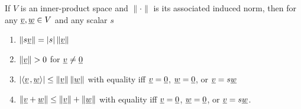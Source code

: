 \begin{theorem}
If $V$ is an inner-product space and $\| \cdot \|$ is its associated induced norm, then for any $\underline{v}, \underline{w} \in V$ and any scalar $s$
\begin{enumerate}
\item $\left\| s \underline{v} \right\| = |s| \left\| \underline{v} \right\|$
\item $\left\| \underline{v} \right\| > 0$ for $\underline{v} \neq \underline{0}$
\item $\left| {\left\langle  \underline{v}  \mskip2mu ,  \underline{w}  \right\rangle} \right| \leq \left\| \underline{v} \right\| \left\| \underline{w} \right\|$ with equality iff $\underline{v} = \underline{0}$, $\underline{w}=\underline{0}$, or $\underline{v} = s \underline{w}$
\item $\left\| \underline{v} + \underline{w} \right\| \leq \left\| \underline{v} \right\| + \left\| \underline{w} \right\|$ with equality iff $\underline{v} = \underline{0}$, $\underline{w}=\underline{0}$, or $\underline{v} = s \underline{w}$.
\end{enumerate}
\end{theorem}
